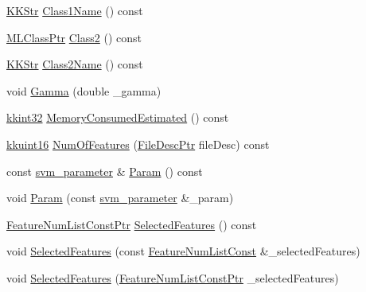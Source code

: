 \begin{DoxyCompactItemize}
\hyperlink{class_k_k_b_1_1_k_k_str}{K\+K\+Str} \hyperlink{class_k_k_m_l_l_1_1_binary_class_parms_a2cc986dba48d87b704d539d00fe25c76}{Class1\+Name} () const 
\item 
\hyperlink{namespace_k_k_m_l_l_ac272393853d59e72e8456f14cd6d8c23}{M\+L\+Class\+Ptr} \hyperlink{class_k_k_m_l_l_1_1_binary_class_parms_a38ea0c5dd0416d6aef402befeaf7a220}{Class2} () const 
\item 
\hyperlink{class_k_k_b_1_1_k_k_str}{K\+K\+Str} \hyperlink{class_k_k_m_l_l_1_1_binary_class_parms_ac587f3be83bd1007dceb8224a977acf9}{Class2\+Name} () const 
\item 
void \hyperlink{class_k_k_m_l_l_1_1_binary_class_parms_ae4410ca128026fede47b3fee5926a160}{Gamma} (double \+\_\+gamma)
\item 
\hyperlink{namespace_k_k_b_a8fa4952cc84fda1de4bec1fbdd8d5b1b}{kkint32} \hyperlink{class_k_k_m_l_l_1_1_binary_class_parms_ad6fbf946bc6a6e229f76c1832e67240e}{Memory\+Consumed\+Estimated} () const 
\item 
\hyperlink{namespace_k_k_b_aa8c7d4d30381c8a0b6fce68974a9c8a9}{kkuint16} \hyperlink{class_k_k_m_l_l_1_1_binary_class_parms_a3a6f931752f33331e0079a0f6b790ccd}{Num\+Of\+Features} (\hyperlink{namespace_k_k_m_l_l_aa0d0b6ab4ec18868a399b8455b05d914}{File\+Desc\+Ptr} file\+Desc) const 
\item 
const \hyperlink{class_k_k_m_l_l_1_1_binary_class_parms_ae660a06ef9477c95e89b3f1e883ca858}{svm\+\_\+parameter} \& \hyperlink{class_k_k_m_l_l_1_1_binary_class_parms_a8b29f264963789ce9145e8baa589b088}{Param} () const 
\item 
void \hyperlink{class_k_k_m_l_l_1_1_binary_class_parms_a6a3f807d0460ced696e128b28d7faaba}{Param} (const \hyperlink{class_k_k_m_l_l_1_1_binary_class_parms_ae660a06ef9477c95e89b3f1e883ca858}{svm\+\_\+parameter} \&\+\_\+param)
\item 
\hyperlink{namespace_k_k_m_l_l_a81284b0a14973267260023f9a72da94a}{Feature\+Num\+List\+Const\+Ptr} \hyperlink{class_k_k_m_l_l_1_1_binary_class_parms_a2885a141b7eb3f3230e9c164265adcab}{Selected\+Features} () const 
\item 
void \hyperlink{class_k_k_m_l_l_1_1_binary_class_parms_a2b4301050d057fb83c65af54f196bbc1}{Selected\+Features} (const \hyperlink{namespace_k_k_m_l_l_ad276a9ed309552a63300bce930bdfebd}{Feature\+Num\+List\+Const} \&\+\_\+selected\+Features)
\item 
void \hyperlink{class_k_k_m_l_l_1_1_binary_class_parms_a53015103293f00a88a8226f11c427da4}{Selected\+Features} (\hyperlink{namespace_k_k_m_l_l_a81284b0a14973267260023f9a72da94a}{Feature\+Num\+List\+Const\+Ptr} \+\_\+selected\+Features)

\end{DoxyCompactItemize}
